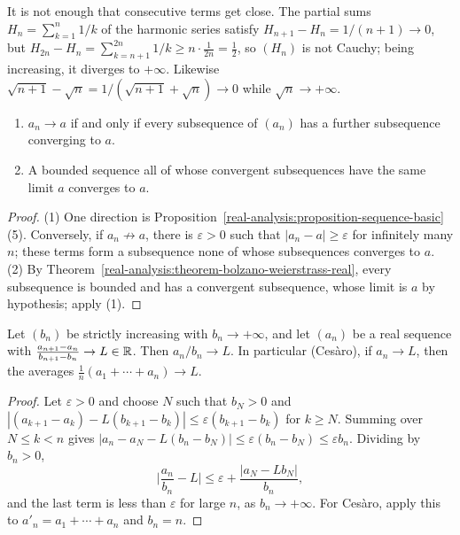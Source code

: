 \begin{counterexample}\label{real-analysis:counterexample-consecutive-differences}
It is not enough that consecutive terms get close. The partial sums $H_n = \sum_{k=1}^n1/k$ of the harmonic series satisfy $H_{n+1} - H_n = 1/(n + 1) \to 0$, but
$H_{2n} - H_n = \sum_{k=n+1}^{2n}1/k \geq n \cdot \frac{1}{2n} = \frac12$, so $(H_n)$ is not Cauchy; being increasing, it diverges to $+\infty$. Likewise $\sqrt{n + 1} - \sqrt n = 1/(\sqrt{n + 1} + \sqrt n) \to 0$
while $\sqrt n \to +\infty$.
\end{counterexample}

\begin{proposition}\label{real-analysis:proposition-subsequence-criterion}
\begin{enumerate}
\item $a_n \to a$ if and only if every subsequence of $(a_n)$ has a further subsequence converging to $a$.
\item A bounded sequence all of whose convergent subsequences have the same limit $a$ converges to $a$.
\end{enumerate}
\end{proposition}

\begin{proof}
(1) One direction is Proposition~\ref{real-analysis:proposition-sequence-basic}(5). Conversely, if $a_n \not\to a$, there is $\varepsilon > 0$ such that $|a_n - a| \geq \varepsilon$ for infinitely many $n$; these terms form a
subsequence none of whose subsequences converges to $a$. (2) By Theorem~\ref{real-analysis:theorem-bolzano-weierstrass-real}, every subsequence is bounded and has a convergent subsequence, whose limit is $a$ by
hypothesis; apply (1).
\end{proof}

\begin{proposition}\label{real-analysis:proposition-stolz-cesaro}
Let $(b_n)$ be strictly increasing with $b_n \to +\infty$, and let $(a_n)$ be a real sequence with $\frac{a_{n+1} - a_n}{b_{n+1} - b_n} \to L \in \mathbb{R}$. Then $a_n/b_n \to L$. In particular (Ces\`aro), if $a_n \to L$, then
the averages $\frac{1}{n}(a_1 + \cdots + a_n) \to L$.
\end{proposition}

\begin{proof}
Let $\varepsilon > 0$ and choose $N$ such that $b_N > 0$ and $|(a_{k+1} - a_k) - L(b_{k+1} - b_k)| \leq \varepsilon(b_{k+1} - b_k)$ for $k \geq N$. Summing over $N \leq k < n$ gives
$|a_n - a_N - L(b_n - b_N)| \leq \varepsilon(b_n - b_N) \leq \varepsilon b_n$. Dividing by $b_n > 0$,
\[
\Big|\frac{a_n}{b_n} - L\Big| \leq \varepsilon + \frac{|a_N - Lb_N|}{b_n},
\]
and the last term is less than $\varepsilon$ for large $n$, as $b_n \to +\infty$. For Ces\`aro, apply this to $a'_n = a_1 + \cdots + a_n$ and $b_n = n$.
\end{proof}

